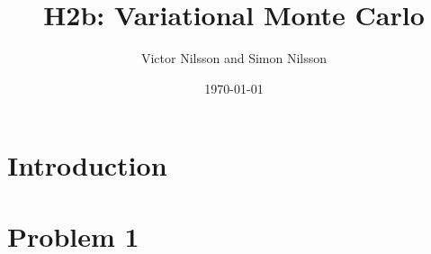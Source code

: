



\title{H2b: Variational Monte Carlo}
\author{Victor Nilsson and Simon Nilsson}
\date{\today}





\section*{Introduction}



\section*{Problem 1}

